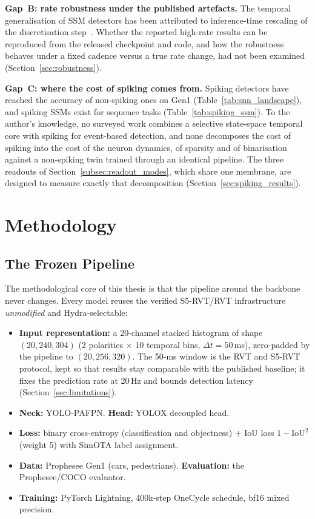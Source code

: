 \documentclass[11pt, a4paper]{report}
\begin{document}
\textbf{Gap~B: rate robustness under the published artefacts.} The temporal generalisation of SSM detectors
has been attributed to inference-time rescaling of the discretisation step~\cite{zubic2024state}. Whether
the reported high-rate results can be reproduced from the released checkpoint and code, and how the
robustness behaves under a fixed cadence versus a true rate change, had not been examined
(Section~\ref{sec:robustness}).

\textbf{Gap~C: where the cost of spiking comes from.} Spiking detectors have reached the accuracy of
non-spiking ones on Gen1 (Table~\ref{tab:snn_landscape}), and spiking SSMs exist for sequence tasks
(Table~\ref{tab:spiking_ssm}). To the author's knowledge, no surveyed work combines a selective state-space
temporal core with spiking for event-based detection, and none decomposes the cost of spiking into the cost
of the neuron dynamics, of sparsity and of binarisation against a non-spiking twin trained through an
identical pipeline. The three readouts of Section~\ref{subsec:readout_modes}, which share one membrane, are
designed to measure exactly that decomposition (Section~\ref{sec:spiking_results}).


\chapter{Methodology}
\label{ch:method}

\section{The Frozen Pipeline}
\label{sec:frozen_pipeline}
The methodological core of this thesis is that the pipeline around the backbone never changes. Every
model reuses the verified S5-RVT/RVT infrastructure \emph{unmodified} and Hydra-selectable:

\begin{itemize}
  \item \textbf{Input representation:} a 20-channel stacked histogram of shape $(20, 240, 304)$
        (2 polarities $\times$ 10 temporal bins, $\Delta t = 50$\,ms), zero-padded by
        the pipeline to $(20, 256, 320)$. The 50-ms window is the RVT and S5-RVT protocol, kept so that
        results stay comparable with the published baseline; it fixes the prediction rate at 20\,Hz and
        bounds detection latency (Section~\ref{sec:limitations}).
  \item \textbf{Neck:} YOLO-PAFPN. \textbf{Head:} YOLOX decoupled head.
  \item \textbf{Loss:} binary cross-entropy (classification and objectness) $+$ IoU loss $1-\mathrm{IoU}^2$
        (weight 5) with SimOTA label assignment.
  \item \textbf{Data:} Prophesee Gen1 (cars, pedestrians). \textbf{Evaluation:} the Prophesee/COCO evaluator.
  \item \textbf{Training:} PyTorch Lightning, 400k-step OneCycle schedule, bf16 mixed precision.
\end{itemize}
\end{document}

